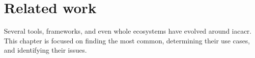 \chapter{Related work}



Several tools, frameworks, and even whole ecosystems have evolved around \gls{iacacr}. This chapter is focused on finding the most common, determining their use cases, and identifying their issues.

